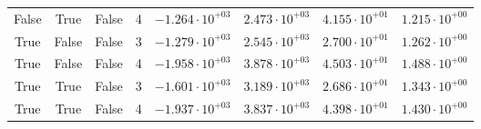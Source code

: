 \documentclass[12pt,a4paper]{article}
\begin{document}
\begin{table}
\begin{tabular}{cccccccc}
False & True & False & 4 & $-1.264 \cdot 10^{+03}$ & $2.473 \cdot 10^{+03}$ & $4.155 \cdot 10^{+01}$ & $1.215 \cdot 10^{+00}$ \\
True & False & False & 3 & $-1.279 \cdot 10^{+03}$ & $2.545 \cdot 10^{+03}$ & $2.700 \cdot 10^{+01}$ & $1.262 \cdot 10^{+00}$ \\
True & False & False & 4 & $-1.958 \cdot 10^{+03}$ & $3.878 \cdot 10^{+03}$ & $4.503 \cdot 10^{+01}$ & $1.488 \cdot 10^{+00}$ \\
True & True & False & 3 & $-1.601 \cdot 10^{+03}$ & $3.189 \cdot 10^{+03}$ & $2.686 \cdot 10^{+01}$ & $1.343 \cdot 10^{+00}$ \\
True & True & False & 4 & $-1.937 \cdot 10^{+03}$ & $3.837 \cdot 10^{+03}$ & $4.398 \cdot 10^{+01}$ & $1.430 \cdot 10^{+00}$ \\
\bottomrule
\end{tabular}
\end{table}
\end{document}
